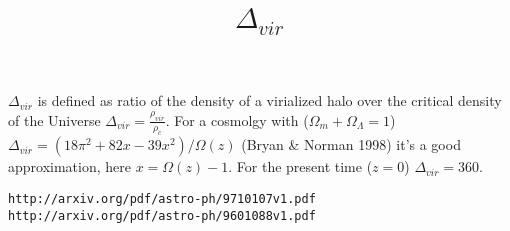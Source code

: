 \documentclass[12pt]{article}
\title{\begin{LARGE}
{$\Delta_{vir}$}
\end{LARGE}}
\begin{document}
\maketitle

$\Delta_{vir}$ is defined as ratio of the density of a virialized halo over the critical density of the Universe $\Delta_{vir} = \frac{\rho_{vir}}{\rho_c}$.
For a cosmolgy with ($\Omega_m + \Omega_{\Lambda} = 1$) $\Delta_{vir} = (18 \pi^2 + 82x - 39x^2)/\Omega(z)$ (Bryan & Norman 1998) it's a good approximation, here $x=\Omega(z)-1$.
For the present time ($z=0$)  $\Delta_{vir}=360$.

\verb+http://arxiv.org/pdf/astro-ph/9710107v1.pdf+
\verb+http://arxiv.org/pdf/astro-ph/9601088v1.pdf+
\end{document}
